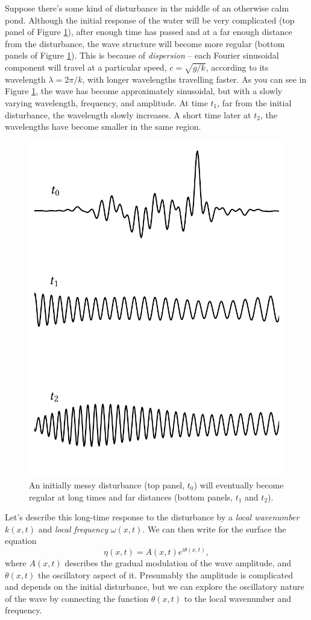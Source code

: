 Suppose there's some kind of disturbance in the middle of an otherwise calm pond.  Although the initial response of the water will be very complicated (top panel of Figure \ref{fig_long_response}), after enough time has passed and at a far enough distance from the disturbance, the wave structure will become more regular (bottom panels of Figure \ref{fig_long_response}).  This is because of \emph{dispersion} -- each Fourier sinusoidal component will travel at a particular speed, $c = \sqrt{g/k}$, according to its wavelength $\lambda = 2\pi/k$, with longer wavelengths travelling faster.  As you can see in Figure \ref{fig_long_response}, the wave has become approximately sinusoidal, but with a slowly varying wavelength, frequency, and amplitude.  At time $t_1$, far from the initial disturbance, the wavelength slowly increases.  A short time later at $t_2$, the wavelengths have become smaller in the same region.

\begin{figure}
\centering\includegraphics[width=0.7\linewidth]{Figures/Chapter5/fig_long_response}
\caption{An initially messy disturbance (top panel, $t_0$) will eventually become regular at long times and far distances (bottom panels, $t_1$ and $t_2$). }
\label{fig_long_response}
\end{figure}

Let's describe this long-time response to the disturbance by a \emph{local wavenumber} $k(x, t)$ and \emph{local frequency} $\omega(x, t)$.  We can then write for the surface the equation
\begin{equation}
\eta(x, t) = A(x, t) e^{i\theta(x, t)},
\end{equation}
where $A(x, t)$ describes the gradual modulation of the wave amplitude, and $\theta(x, t)$ the oscillatory aspect of it.  Presumably the amplitude is complicated and depends on the initial disturbance, but we can explore the oscillatory nature of the wave by connecting the function $\theta(x, t)$ to the local wavenumber and frequency.

